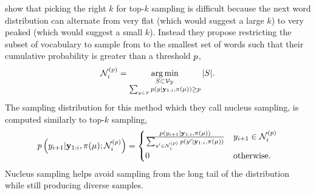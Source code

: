 \citet{holtzman2019} show that picking the right $k$ for top-$k$ sampling is
difficult because the next word distribution can alternate from very flat
(which would suggest a large $k$) to very peaked (which would suggest a small
$k$).  Instead they propose restricting the subset of vocabulary to sample from
to the smallest set of words such that their cumulative probability is greater
than a threshold $p$,
\[ {\mathcal{N}}_{i}^{(p)} = \operatorname*{arg\,min}_{\substack{S \subset \mathcal{V}_{\mathcal{Y}} \\
\sum_{y \in S} p(y|\mathbf{y}_{1:i},\pi(\mu)) \ge p  }}
{\left\vert S \right\vert}. \] The sampling distribution for this method which they call
nucleus sampling, is computed similarly to top-$k$ sampling,
\[
p\left(y_{i+1}|\mathbf{y}_{1:i},\pi(\mu); {\mathcal{N}}_{i}^{(p)} \right)
    =
    \begin{cases} 
   \frac{
   p(y_{i+1}|\mathbf{y}_{1:i},\pi(\mu))
   }{ 
       \sum_{y^\prime \in {\mathcal{N}}_{i}^{(p)} }
   p(y^\prime|\mathbf{y}_{1:i},\pi(\mu))  
   }  & y_{i+1} \in {\mathcal{N}}_{i}^{(p)} \\ 
0 & \textrm{otherwise}. \end{cases} 
\]
Nucleus sampling helps avoid sampling from the long tail of the distribution
while still producing diverse samples.
